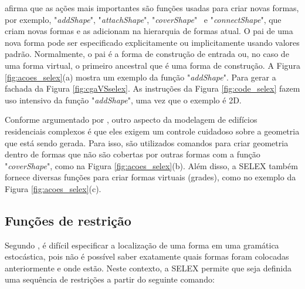  afirma que as ações mais importantes são funções usadas para criar novas formas, por exemplo, "\textit{addShape}", "\textit{attachShape}", "\textit{coverShape}" \, e "\textit{connectShape}", que criam novas formas e as adicionam na hierarquia de formas atual. O pai de uma nova forma pode ser especificado explicitamente ou implicitamente usando valores padrão. Normalmente, o pai é a forma de construção de entrada ou, no caso de uma forma virtual, o primeiro ancestral que é uma forma de construção. A Figura \ref{fig:acoes_selex}(a) mostra um exemplo da função "\textit{addShape}". Para gerar a fachada da Figura \ref{fig:cgaVSselex}. As instruções da Figura \ref{fig:code_selex} fazem uso intensivo da função "\textit{addShape}", uma vez que o exemplo é 2D.

Conforme argumentado por , outro aspecto da modelagem de edifícios residenciais complexos é que eles exigem um controle cuidadoso sobre a geometria que está sendo gerada. Para isso, são utilizados comandos para criar geometria dentro de formas que não são cobertas por outras formas com a função "\textit{coverShape}", como na Figura \ref{fig:acoes_selex}(b). Além disso, a \gls{SELEX} também fornece diversas funções para criar formas virtuais (grades), como no exemplo da Figura \ref{fig:acoes_selex}(c).

\begin{figure}[h!]
	\centering
	\captionsetup{width=15cm}
	{}	
\end{figure}

\subsection{Funções de restrição}
\label{sec:selex_funcoes}

Segundo , é difícil especificar a localização de uma forma em uma gramática estocástica, pois não é possível saber exatamente quais formas foram colocadas anteriormente e onde estão. Neste contexto, a \gls{SELEX} permite que seja definida uma sequência de restrições a partir do seguinte comando:

